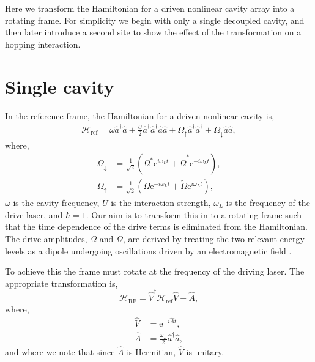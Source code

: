 Here we transform the Hamiltonian for a driven nonlinear cavity array into a rotating frame. For simplicity we begin with only a single decoupled cavity, and then later introduce a second site to show the effect of the transformation on a hopping interaction.

\section{Single cavity}

In the reference frame, the Hamiltonian for a driven nonlinear cavity is,
\begin{align}
	\mathcal{H}_{\mathrm{ref}} = \omega\hat{a}^{\dagger}\hat{a} + \frac{U}{2}\hat{a}^{\dagger}\hat{a}^{\dagger}\hat{a}\hat{a} + \Omega_{\uparrow}\hat{a}^{\dagger}\hat{a}^{\dagger} + \Omega_{\downarrow}\hat{a}\hat{a},
	\label{eq:rot1}
\end{align}
where, 
\begin{align}
	\Omega_{\downarrow} &= \frac{1}{\sqrt{2}} \left( \Omega^{*}\mathrm{e}^{i\omega_{L}t} + \tilde{\Omega}^{*}\mathrm{e}^{-i\omega_{L}t} \right), \label{eq:rot2} \\
	\Omega_{\uparrow} &= \frac{1}{\sqrt{2}} \left(\Omega\mathrm{e}^{-i\omega_{L}t} + \tilde{\Omega}\mathrm{e}^{i\omega_{L}t}\right), \label{eq:rot3}
\end{align}
\(\omega\) is the cavity frequency, \(U\) is the interaction strength, \(\omega_{L}\) is the frequency of the drive laser, and \(\hbar = 1\). Our aim is to transform this in to a rotating frame such that the time dependence of the drive terms is eliminated from the Hamiltonian. The drive amplitudes, \(\Omega\) and \(\tilde{\Omega}\), are derived by treating the two relevant energy levels as a dipole undergoing oscillations driven by an electromagnetic field \cite{Fox_Omega}.

To achieve this the frame must rotate at the frequency of the driving laser. The appropriate transformation is,
\begin{equation}
	\mathcal{H}_{\mathrm{RF}} = \hat{V}^{\dagger}\mathcal{H}_{\mathrm{ref}}\hat{V} - \hat{A},
	\label{eq:rot4}
\end{equation}
where,
\begin{align}
	\hat{V} &= \mathrm{e}^{-i\hat{A}t}, \label{eq:rot5} \\
	\hat{A} &= \frac{\omega_{L}}{2} \hat{a}^{\dagger}\hat{a}, \label{eq:rot6}
\end{align}
and where we note that since \(\hat{A}\) is Hermitian, \(\hat{V}\) is unitary.

